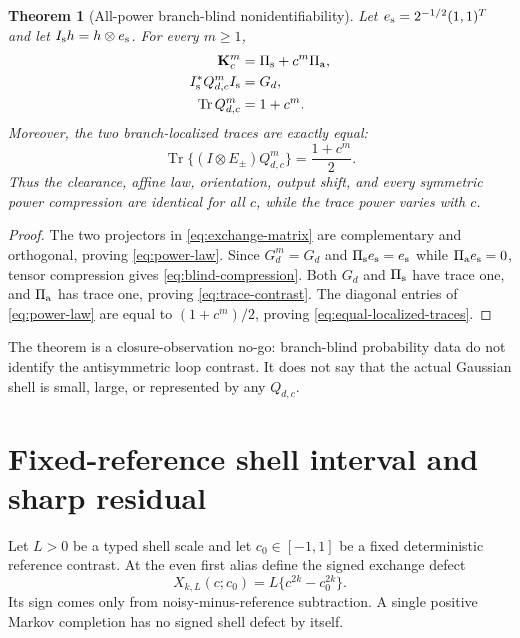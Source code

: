 \documentclass[11pt]{article}
\newtheorem{theorem}{Theorem}[section]
\theoremstyle{remark}
\newcommand{\Tr}{\operatorname{Tr}}
\newcommand{\bK}{\mathbf K}
\begin{document}
\begin{theorem}[All-power branch-blind nonidentifiability]
\label{thm:nonidentifiability}
Let $e_{\rm s}=2^{-1/2}(1,1)^T$ and let
$I_{\rm s}h=h\otimes e_{\rm s}$.  For every $m\ge1$,
\begin{align}
 \bK_c^m&=\Pi_{\rm s}+c^m\Pi_{\rm a},
 \label{eq:power-law}\\
 I_{\rm s}^*Q_{d,c}^mI_{\rm s}&=G_d,
 \label{eq:blind-compression}\\
 \Tr Q_{d,c}^m&=1+c^m.
 \label{eq:trace-contrast}
\end{align}
Moreover, the two branch-localized traces are exactly equal:
\begin{equation}
 \Tr\{(I\otimes E_\pm)Q_{d,c}^m\}
 =\frac{1+c^m}{2}.
 \label{eq:equal-localized-traces}
\end{equation}
Thus the clearance, affine law, orientation, output shift, and every
symmetric power compression are identical for all $c$, while the trace
power varies with $c$.
\end{theorem}

\begin{proof}
The two projectors in \eqref{eq:exchange-matrix} are complementary and
orthogonal, proving \eqref{eq:power-law}.  Since $G_d^m=G_d$ and
$\Pi_{\rm s}e_{\rm s}=e_{\rm s}$ while
$\Pi_{\rm a}e_{\rm s}=0$, tensor compression gives
\eqref{eq:blind-compression}.  Both $G_d$ and $\Pi_{\rm s}$ have trace one,
and $\Pi_{\rm a}$ has trace one, proving \eqref{eq:trace-contrast}.
The diagonal entries of \eqref{eq:power-law} are equal to
$(1+c^m)/2$, proving \eqref{eq:equal-localized-traces}.
\end{proof}

The theorem is a closure-observation no-go: branch-blind probability data
do not identify the antisymmetric loop contrast.  It does not say that the
actual Gaussian shell is small, large, or represented by any $Q_{d,c}$.

\section{Fixed-reference shell interval and sharp residual}

Let $L>0$ be a typed shell scale and let $c_0\in[-1,1]$ be a fixed
deterministic reference contrast.  At the even first alias define the
signed exchange defect
\begin{equation}
 X_{k,L}(c;c_0)=L\{c^{2k}-c_0^{2k}\}.
 \label{eq:exchange-defect}
\end{equation}
Its sign comes only from noisy-minus-reference subtraction.  A single
positive Markov completion has no signed shell defect by itself.
\end{document}

